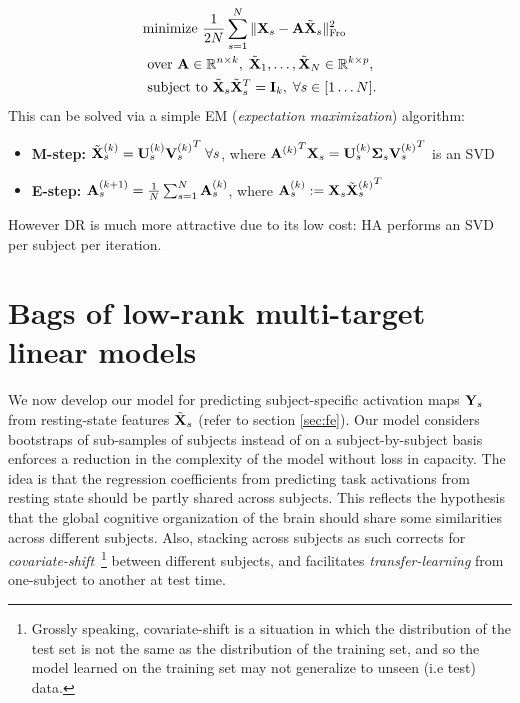 \begin{eqnarray}
  \begin{split}
    &\text{minimize }\frac{1}{2N}\sum_{s=1}^N\|\mathbf{X}_s - \mathbf{A}\tilde{\mathbf{X}}_s\|^2_{\text{Fro}}\\
    &\text{ over }
  \mathbf{A} \in \mathbb R^{n \times k},\;\tilde{\mathbf{X}}_1,\ldots,\tilde{\mathbf{X}}_N \in \mathbb R^{k \times p},
  \\
  &\text{ subject to }\tilde{\mathbf{X}}_s\tilde{\mathbf{X}}_s^T = \mathbf{I}_k,\; \forall s \in [1\ldots N].
  \end{split}
\end{eqnarray}
This can be solved via a simple EM (\textit{expectation maximization}) algorithm:

\begin{itemize}
\item \textbf{M-step:} $\tilde{\mathbf{X}}_s^{(k)} = \mathbf{U}_s^{(k)}{\mathbf{V}_s^{(k)}}^T\; \forall s$, where ${\mathbf{A}^{(k)}}^T\mathbf{X}_s = \mathbf{U}_s^{(k)}\boldsymbol{\Sigma}_s{\mathbf{V}_s^{(k)}}^T$ is an SVD
\item \textbf{E-step:} $\mathbf{A}_s^{(k+1)} = \frac{1}{N}\sum_{s=1}^N\mathbf{A}_s^{(k)}$, where $\mathbf{A}_s^{(k)} := \mathbf{X}_s{{}\tilde{\mathbf{X}}_s^{(k)}}^T$
\end{itemize}

However DR is much more attractive due to its low cost: HA performs an SVD per subject per iteration.

\section{Bags of low-rank multi-target linear models}
\label{sec:bags}
We now develop our model for predicting subject-specific activation maps $\mathbf{Y}_s$ from resting-state features $\tilde{\mathbf{X}}_s$
(refer to section \ref{sec:fe}).
Our model considers bootstraps of sub-samples of subjects instead of on a subject-by-subject
basis enforces a reduction in the complexity of the model without loss in capacity.
The idea is that the regression coefficients from predicting task activations
from resting state should be partly shared across subjects. 
%
This reflects the hypothesis that the global cognitive organization of the brain should share some
similarities across different subjects. Also, stacking across subjects as such corrects for \textit{covariate-shift}~\footnote{Grossly speaking, covariate-shift is a situation in which the distribution of the test set is not the same as the distribution of the training set, and so the model learned on the training set may not generalize to unseen (i.e test) data.}
between different subjects, and facilitates \textit{transfer-learning} from one-subject to another at test time.


